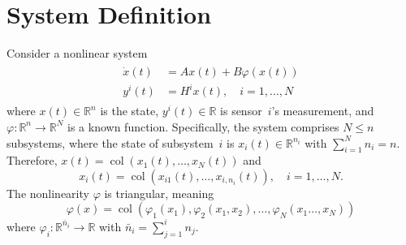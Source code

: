 \documentclass[journal]{IEEEtran}
\newcommand{\col}{\operatorname{col}}
\begin{document}
\section{System Definition}
\label{sec:sys-def}
Consider a nonlinear system
\begin{align}
\begin{aligned}\label{eq:sys}
        \dot x(t) &= Ax(t) + B\varphi(x(t))\\
        y^i(t) &= H^i x(t), \quad i=1,\dots,N
\end{aligned}
\end{align}
where $x(t)\in\mathbb R^n$ is the state, $y^i(t)\in\mathbb R$ is sensor~$i$'s measurement, and $\varphi:\mathbb R^n\to\mathbb R^N$ is a known function.
Specifically, the system comprises $N\leq n$ subsystems, where the state of subsystem~$i$ is $x_i(t)\in\mathbb R^{n_i}$ with $\sum_{i=1}^N n_i = n$. Therefore, $x(t)= \col(x_1(t), \ldots, x_N(t))$ and
\begin{equation*}
    x_i(t) = \col(x_{i1}(t),\ldots,x_{i,n_i}(t)), \quad i=1,\ldots,N.
\end{equation*}
The nonlinearity $\varphi$ is triangular, meaning
\begin{equation}
\label{eq:var-phi}
\varphi(x)= \col(\varphi_1(x_1),\varphi_2(x_1,x_2),\ldots,\varphi_N(x_1\ldots,x_N))
\end{equation}
where $\varphi_i:\mathbb R^{\bar n_i}\to\mathbb R$ with $\bar n_i=\sum_{j=1}^i n_j$.
\end{document}
